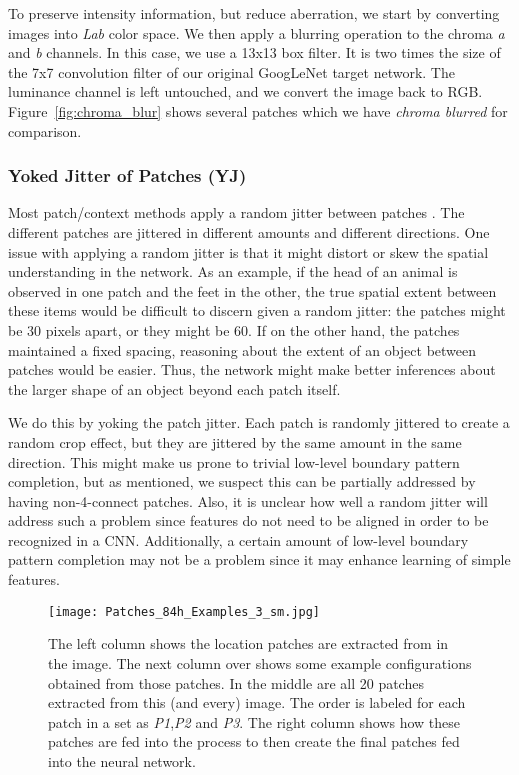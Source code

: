 \documentclass[10pt,twocolumn,letterpaper]{article}
\begin{document}
To preserve intensity information, but reduce aberration, we start by converting images into \emph{Lab} color space. We then apply a blurring operation to the chroma \emph{a} and \emph{b} channels. In this case, we use a 13x13 box filter. It is two times the size of the 7x7 convolution filter of our original GoogLeNet target network. The luminance channel is left untouched, and we convert the image back to RGB. Figure~\ref{fig:chroma_blur} shows several patches which we have \emph{chroma blurred} for comparison.

\subsubsection{Yoked Jitter of Patches (YJ)}

Most patch/context methods apply a random jitter between patches \cite{Doersch15,Noroozi16a,Doersch17,Lee17}. The different patches are jittered in different amounts and different directions.  One issue with applying a random jitter is that it might distort or skew the spatial understanding in the network. As an example, if the head of an animal is observed in one patch and the feet in the other, the true spatial extent between these items would be difficult to discern given a random jitter: the patches might be 30 pixels apart, or they might be 60. If on the other hand, the patches maintained a fixed spacing, reasoning about the extent of an object between patches would be easier. Thus, the network might make better inferences about the larger shape of an object beyond each patch itself. 

We do this by yoking the patch jitter. Each patch is randomly jittered to create a random crop effect, but they are jittered by the same amount in the same direction. This might make us prone to trivial low-level boundary pattern completion, but as mentioned, we suspect this can be partially addressed by having non-4-connect patches. Also, it is unclear how well a random jitter will address such a problem since features do not need to be aligned in order to be recognized in a CNN. Additionally, a certain amount of low-level boundary pattern completion may not be a problem since it may enhance learning of simple features. 
\begin{figure*}
\centering
\texttt{[image: Patches\_84h\_Examples\_3\_sm.jpg]}
\caption{The left column shows the location patches are extracted from in the image. The next column over shows some example configurations obtained from those patches. In the middle are all 20 patches extracted from this (and every) image. The order is labeled for each patch in a set as \emph{P1},\emph{P2} and \emph{P3}. The right column shows how these patches are fed into the process to then create the final patches fed into the neural network.}
\label{fig:patch_example}
\end{figure*}
\end{document}
